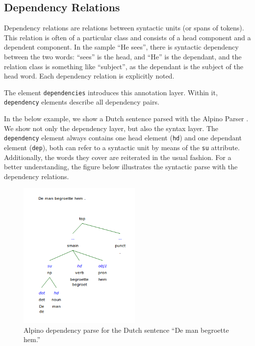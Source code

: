 \documentclass[a4paper,12pt]{report}
\begin{document}
\subsection{Dependency Relations}

Dependency relations are relations between syntactic units (or spans of tokens). This relation is often of a particular class and consists of a head component and a dependent component. In the sample ``He sees'', there is  syntactic dependency between the two words: ``sees'' is the head, and ``He'' is the dependant, and the relation class is something like ``subject'', as the dependant is the subject of the head word. Each dependency relation is explicitly noted.

The element \texttt{dependencies} introduces this annotation layer. Within it, \texttt{dependency} elements describe all dependency pairs. 

In the below example, we show a Dutch sentence parsed with the Alpino Parser \cite{ALPINO}. We show not only the dependency layer, but also the syntax layer. The \texttt{dependency} element always contains one head element (\texttt{hd}) and one dependant element (\texttt{dep}), both can refer to a syntactic unit by means of the \texttt{su} attribute. Additionally, the words they cover are reiterated in the usual fashion. For a better understanding, the figure below illustrates the syntactic parse with the dependency relations.

\begin{figure}[h]
\begin{center}
\includegraphics[width=60.0mm]{alpino.png}
\end{center}
\caption{Alpino dependency parse for the Dutch sentence ``De man begroette hem.''}
\label{fig:arch} 
\end{figure}
\FloatBarrier
\end{document}
